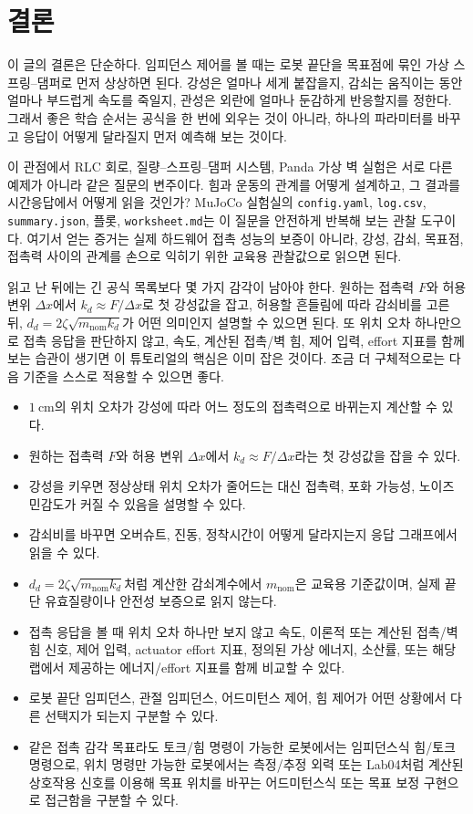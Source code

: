 \section{결론}

이 글의 결론은 단순하다.
임피던스 제어를 볼 때는 로봇 끝단을 목표점에 묶인 가상 스프링--댐퍼로 먼저 상상하면 된다.
강성은 얼마나 세게 붙잡을지, 감쇠는 움직이는 동안 얼마나 부드럽게 속도를 죽일지, 관성은 외란에 얼마나 둔감하게 반응할지를 정한다.
그래서 좋은 학습 순서는 공식을 한 번에 외우는 것이 아니라, 하나의 파라미터를 바꾸고 응답이 어떻게 달라질지 먼저 예측해 보는 것이다.

이 관점에서 RLC 회로, 질량--스프링--댐퍼 시스템, Panda 가상 벽 실험은 서로 다른 예제가 아니라 같은 질문의 변주이다.
힘과 운동의 관계를 어떻게 설계하고, 그 결과를 시간응답에서 어떻게 읽을 것인가?
MuJoCo 실험실의 \texttt{config.yaml}, \texttt{log.csv}, \texttt{summary.json}, 플롯, \texttt{worksheet.md}는 이 질문을 안전하게 반복해 보는 관찰 도구이다.
여기서 얻는 증거는 실제 하드웨어 접촉 성능의 보증이 아니라, 강성, 감쇠, 목표점, 접촉력 사이의 관계를 손으로 익히기 위한 교육용 관찰값으로 읽으면 된다.

읽고 난 뒤에는 긴 공식 목록보다 몇 가지 감각이 남아야 한다.
원하는 접촉력 \(F\)와 허용 변위 \(\Delta x\)에서 \(k_d \approx F/\Delta x\)로 첫 강성값을 잡고, 허용할 흔들림에 따라 감쇠비를 고른 뒤, \(d_d=2\zeta\sqrt{m_{\mathrm{nom}}k_d}\)가 어떤 의미인지 설명할 수 있으면 된다.
또 위치 오차 하나만으로 접촉 응답을 판단하지 않고, 속도, 계산된 접촉/벽 힘, 제어 입력, effort 지표를 함께 보는 습관이 생기면 이 튜토리얼의 핵심은 이미 잡은 것이다.
조금 더 구체적으로는 다음 기준을 스스로 적용할 수 있으면 좋다.

\begin{itemize}
  \item $1~\mathrm{cm}$의 위치 오차가 강성에 따라 어느 정도의 접촉력으로 바뀌는지 계산할 수 있다.
  \item 원하는 접촉력 $F$와 허용 변위 $\Delta x$에서 $k_d \approx F/\Delta x$라는 첫 강성값을 잡을 수 있다.
  \item 강성을 키우면 정상상태 위치 오차가 줄어드는 대신 접촉력, 포화 가능성, 노이즈 민감도가 커질 수 있음을 설명할 수 있다.
  \item 감쇠비를 바꾸면 오버슈트, 진동, 정착시간이 어떻게 달라지는지 응답 그래프에서 읽을 수 있다.
  \item $d_d=2\zeta\sqrt{m_{\mathrm{nom}}k_d}$처럼 계산한 감쇠계수에서 $m_{\mathrm{nom}}$은 교육용 기준값이며, 실제 끝단 유효질량이나 안전성 보증으로 읽지 않는다.
  \item 접촉 응답을 볼 때 위치 오차 하나만 보지 않고 속도, 이론적 또는 계산된 접촉/벽 힘 신호, 제어 입력, actuator effort 지표, 정의된 가상 에너지, 소산률, 또는 해당 랩에서 제공하는 에너지/effort 지표를 함께 비교할 수 있다.
  \item 로봇 끝단 임피던스, 관절 임피던스, 어드미턴스 제어, 힘 제어가 어떤 상황에서 다른 선택지가 되는지 구분할 수 있다.
  \item 같은 접촉 감각 목표라도 토크/힘 명령이 가능한 로봇에서는 임피던스식 힘/토크 명령으로, 위치 명령만 가능한 로봇에서는 측정/추정 외력 또는 Lab04처럼 계산된 상호작용 신호를 이용해 목표 위치를 바꾸는 어드미턴스식 또는 목표 보정 구현으로 접근함을 구분할 수 있다.
\end{itemize}

